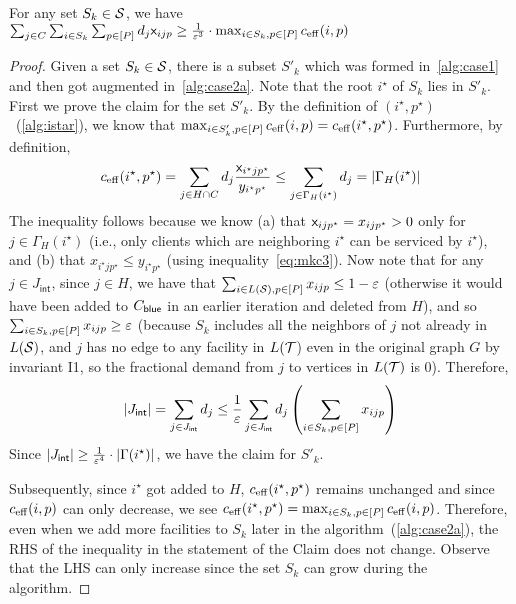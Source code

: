 \begin{claim}\label{clm:imp}
For any set $S_k \in {\cal S}$, we have  $\sum_{j\in C} \sum_{i\in S_k}  \sum_{p\in [P]} d_j {\mathsf x}_{ijp} \geq \frac{1}{\varepsilon^3}\cdot \max_{i\in S_k, p\in [P]} c_{\mathrm{eff}}(i,p) $
\end{claim}
\begin{proof}
Given a set $S_k \in {\cal S}$, there is a subset $S'_k$ which was formed in~\cref{alg:case1} and then got augmented in~\cref{alg:case2a}.
Note that the root $i^\star$ of $S_k$ lies in $S'_k$. First we prove the claim for the set $S'_k$.
By the definition of $(i^\star, p^\star)$~(\cref{alg:istar}), we know that $ \max_{i\in S'_k, p\in [P]} c_{\mathrm{eff}}(i,p)  = c_{\mathrm{eff}}(i^\star,p^\star)$.%
Furthermore, by definition,
\[c_{\mathrm{eff}}(i^\star,p^\star) = \sum_{j\in H\cap C} d_j \frac{{\mathsf x}_{i^\star jp^\star}}{y_{i^\star p^\star}} \leq \sum_{j\in \Gamma_H(i^\star)} d_j = |\Gamma_H(i^\star)|\]
The inequality follows because we know  (a) that ${\mathsf x}_{ijp^\star} = x_{ijp^\star} > 0$ only for $j\in \Gamma_H(i^\star)$ (i.e., only clients which are neighboring $i^\star$ can be serviced by $i^\star$), and (b) that $x_{i^\star jp^\star} \leq y_{i^\star p^\star}$ (using inequality~\eqref{eq:mkc3}).
Now note that for any $j\in J_\mathsf{int}$, since $j\in H$, we have that $\sum_{i\in L({\cal S}), p\in [P]} x_{ijp} \leq 1 - \varepsilon$ (otherwise it would have been added
to $C_{\mathsf{blue}}$ in an earlier iteration and deleted from $H$), and so $\sum_{i\in S_k, p\in [P]} x_{ijp} \geq \varepsilon$ (because $S_k$ includes all the neighbors of $j$ not already in $L({\cal S})$, and $j$ has no edge to any facility in $L({\cal T}$) even in the original graph $G$ by invariant I1, so the fractional demand from $j$ to vertices in $L({\cal T})$ is $0$).
Therefore,
\[
|J_\mathsf{int}| = \sum_{j\in J_\mathsf{int}} d_j  \leq \frac{1}{\varepsilon} \sum_{j\in J_\mathsf{int}} d_j \left(\sum_{i\in S_k, p\in [P]} x_{ijp}\right)
\]
Since  $|J_\mathsf{int}| \geq \frac{1}{\varepsilon^4}\cdot |\Gamma(i^\star)| $, we have the claim for $S'_k$.

	Subsequently, since $i^\star$ got added to $H$, $c_{\mathrm{eff}}(i^\star,p^\star)$ remains unchanged and since $c_{\mathrm{eff}}(i,p)$ can only decrease, we see $c_{\mathrm{eff}}(i^\star,p^\star) =  \max_{i\in S_k,p\in [P]} c_{\mathrm{eff}}(i,p)$.
	Therefore, even when we add more facilities
	to $S_k$ later in the algorithm~(\cref{alg:case2a}), the RHS of the inequality in the statement of the Claim does not change.
	Observe that the LHS can only increase since the set $S_k$ can grow during the algorithm. \end{proof}


